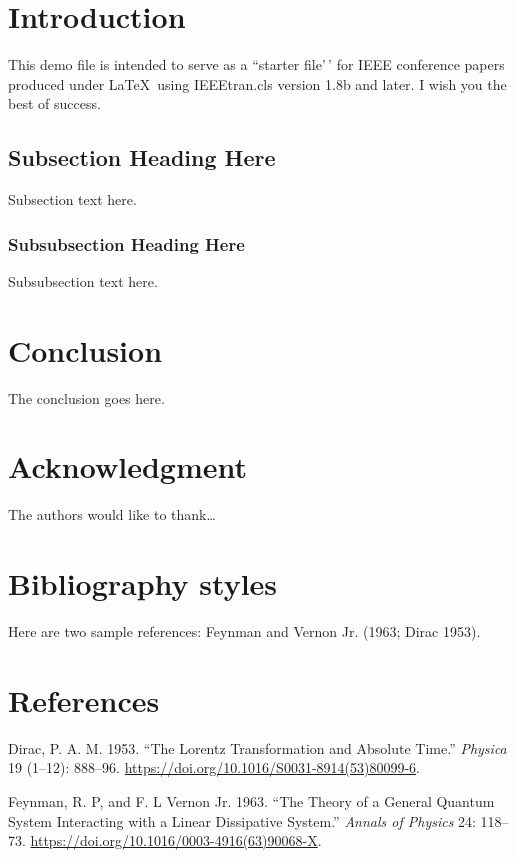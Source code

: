 \documentclass[conference,final,]{IEEEtran}
\newlength{\cslhangindent}
\newenvironment{CSLReferences}[2] %
 {\begin{list}{}{%
  \setlength{\itemindent}{0pt}
  \setlength{\leftmargin}{0pt}
  \setlength{\parsep}{0pt}
  \ifodd #1
   \setlength{\leftmargin}{\cslhangindent}
   \setlength{\itemindent}{-1\cslhangindent}
  \fi
  \setlength{\itemsep}{#2\baselineskip}}}
 {\end{list}}
\begin{document}
\section{Introduction}\label{introduction}

This demo file is intended to serve as a ``starter file'\,' for IEEE
conference papers produced under \LaTeX~using IEEEtran.cls version 1.8b
and later. I wish you the best of success.

\subsection{Subsection Heading Here}\label{subsection-heading-here}

Subsection text here.

\subsubsection{Subsubsection Heading
Here}\label{subsubsection-heading-here}

Subsubsection text here.

\section{Conclusion}\label{conclusion}

The conclusion goes here.

\section{Acknowledgment}\label{acknowledgment}

The authors would like to thank\ldots{}

\section{Bibliography styles}\label{bibliography-styles}

Here are two sample references: Feynman and Vernon Jr. (1963; Dirac
1953).

\newpage

\section*{References}\label{references}

\protect{}\label{refs}
\begin{CSLReferences}{1}{1}
Dirac, P. A. M. 1953. {``The Lorentz Transformation and Absolute
Time.''} \emph{Physica} 19 (1--12): 888--96.
\url{https://doi.org/10.1016/S0031-8914(53)80099-6}.

Feynman, R. P, and F. L Vernon Jr. 1963. {``The Theory of a General
Quantum System Interacting with a Linear Dissipative System.''}
\emph{Annals of Physics} 24: 118--73.
\url{https://doi.org/10.1016/0003-4916(63)90068-X}.

\end{CSLReferences}
\end{document}
